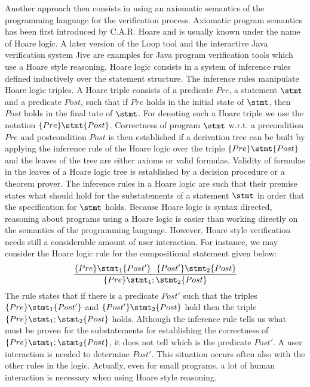 Another approach then consists in using an axiomatic semantics of the programming language for the verification process. 
Axiomatic program semantics has been first introduced by C.A.R. Hoare  \cite{Hoare69ABC} and is usually known under the name of Hoare 
logic. A later version of the Loop tool  \cite{jacobs03java} 
and the interactive Java verification system Jive \cite{MH00Arc} are examples for  Java program verification tools which use  a Hoare style reasoning.   
 Hoare logic consists in a system of inference rules defined inductively over the statement structure. The inference rules manipulate
  Hoare logic triples. A Hoare triple consists of a predicate $Pre$, a statement $\stmt$ and a predicate $Post$,  such 
that if $Pre$  holds in the initial state of $\stmt$,  then  $Post$  holds in the final tate of $\stmt$. For denoting such 
a Hoare  triple we use the  notation $\{Pre \}  \stmt \{Post\}$.
Correctness of program $\stmt$ w.r.t. a precondition $Pre$ and postcondition   $Post$ is then established if a  derivation tree can be built  by applying the inference rule of the Hoare
logic over the triple $\{Pre \}  \stmt \{Post\}$ and the  leaves of the tree are either axioms or valid formulas.
 Validity of formulas in the leaves of a Hoare logic tree is
established by a decision procedure or a theorem prover. 
The inference rules in a Hoare logic are  such that their premise states what should hold for the substatements of a statement $\stmt$ in order that the specification for 
$\stmt$  holds. Because Hoare logic is   syntax directed, reasoning about programs using a Hoare logic is easier than working directly on the
 semantics of the programming language. However, Hoare style verification needs still a considerable amount of user interaction.
For instance, we may consider the Hoare  logic rule for the compositional statement given below:
$$\frac{ \{Pre \}  \stmt_1 \{Post'\} \  \ \{Post'\}  \stmt_2 \{Post\}  }{ \{Pre \}  \stmt_1;\stmt_2 \{Post\} }$$
The rule states that if there is a predicate $Post'$ such that the triples  $\{Pre \}  \stmt_1 \{Post'\}$ and $\{Post'\}  \stmt_2 \{Post\} $ hold then the triple
$\{Pre \}  \stmt_1;\stmt_2 \{Post\} $ holds. 
Although the inference rule tells us what must be proven for the substatements for establishing the correctness of $\{Pre \}  \stmt_1;\stmt_2 \{Post\} $,
 it does not tell which is the predicate $Post'$.
A user interaction is needed to determine  $Post'$. This situation occurs often also with the other rules in the logic.
Actually,  even for small programs, a lot of human interaction  is necessary when  using Hoare style reasoning.
  
